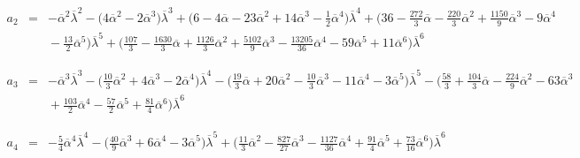 \begin{eqnarray*}
a_2 &=& - \overline{\alpha}^{2}\overline{\lambda}^{2}-
\bigg(4\overline{\alpha}^{2} - 2\overline{\alpha}^{3}\bigg)
\overline{\lambda} ^{3}  + \bigg(6- 4\overline{\alpha} -
23\overline{\alpha}^{2} + 14\overline{\alpha}^{3} - 
{\displaystyle \frac {1}{2}} \overline{\alpha}^{4}\bigg)\overline{\lambda}^{4}
 + \bigg(36 - {\displaystyle \frac {272}{3}} \overline{\alpha} -
 {\displaystyle \frac {220}{3}} \overline{\alpha}^{2} + 
{\displaystyle \frac {1150}{9}} \overline{\alpha}^{3} - 9\overline{\alpha}^{4}
\\  
& & \mbox{}
- {\displaystyle \frac {13}{2}} \overline{\alpha}^{5}\bigg)
\overline{\lambda} ^{5}  + \bigg({\displaystyle 
\frac {107}{3}} - {\displaystyle \frac {1630}{3}} \overline{\alpha} +
{\displaystyle \frac {1126}{3}} \overline{\alpha}^{2} + {\displaystyle \frac {
5102}{9}} \overline{\alpha}^{3} - {\displaystyle \frac {13205}{36}} 
\overline{\alpha}^{4} - 59\overline{\alpha}^{5} + 11\overline{\alpha}^{6}
\bigg)\overline{\lambda}^{6}
\end{eqnarray*}



\begin{eqnarray*}
a_3 &=&- \overline{\alpha}^{3}\overline{\lambda} ^{3} -
\bigg({\displaystyle \frac {10}{3}} \overline{\alpha}^{2} + 
4\overline{\alpha}^{3} - 2
\overline{\alpha}^{4}\bigg)\overline{\lambda} ^{4} - 
\bigg( {\displaystyle \frac {19}{3}} \overline{\alpha} +
20\overline{\alpha}^{2} - {\displaystyle \frac {10}{3}} \overline{\alpha}^{3}
 - 11\overline{\alpha}^{4} - 3
\overline{\alpha}^{5}\bigg)\overline{\lambda} ^{5}
- \bigg( 
{\displaystyle \frac {58}{3}}+ {\displaystyle \frac {104}{3}} 
\overline{\alpha} -
{\displaystyle \frac {224}{9}} \overline{\alpha}^{2} -63\overline{\alpha}^{3} 
\\
& & \mbox{}
 + 
{\displaystyle \frac {103}{2}} \overline{\alpha}^{4} - {\displaystyle \frac {57
}{2}} \overline{\alpha}^{5} + {\displaystyle \frac {81}{4}} 
\overline{\alpha}^{6} \bigg)\overline{\lambda} ^{6} 
\end{eqnarray*}


\begin{eqnarray*}
a_4 &=&- {\displaystyle \frac {5}{4}} \overline{\alpha}^{4}
\overline{\lambda} 
^{4}-\bigg( {\displaystyle \frac {40}{9}} \overline{\alpha}^{3} + 
6\overline{\alpha}^{4} - 3
\overline{\alpha}^{5}\bigg)\overline{\lambda} ^{5} + \bigg({\displaystyle 
\frac {11}{3}} \overline{\alpha}^{2}
 - {\displaystyle \frac {827}{27}} \overline{\alpha}^{3} - {\displaystyle 
\frac {1127}{36}} \overline{\alpha}^{4} + {\displaystyle \frac {91}{4}} 
\overline{\alpha}^{5}
 + {\displaystyle \frac {73}{16}} \overline{\alpha}^{6}\bigg)
\overline{\lambda} ^{6}
\end{eqnarray*}


